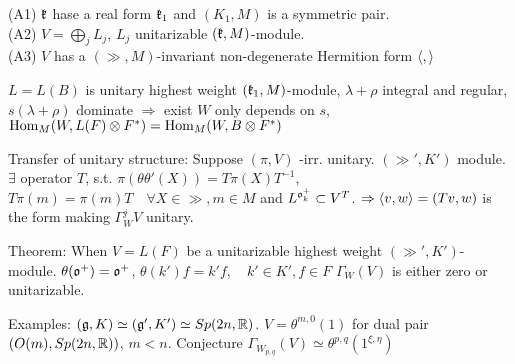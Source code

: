 \documentclass{beamer}
\begin{document}
\begin{frame}[t]
(A1) ${\mathfrak{k}}$ hase a real form ${\mathfrak{k}}_1$ and $(K_1,M)$ is a symmetric pair.\\
(A2) $V = \bigoplus_j L_j$, $L_j$ unitarizable $({\mathfrak{k}},M)$-module.\\
(A3) $V$ has a $(\gg,M)$-invariant non-degenerate Hermition form $\left\langle{},{}\right\rangle$
\end{frame}

\begin{frame}[t]
$L=L(B)$ is unitary highest weight $({\mathfrak{k}}_1,M)$-module, 
$\lambda+\rho$ integral and regular,
$s(\lambda+\rho)$ dominate $\Rightarrow$ exist $W$ only depends on $s$, 
$\mathrm{Hom}_M(W,L(F)\otimes F^*) = \mathrm{Hom}_M(W,B\otimes F^*)$
\end{frame}

\begin{frame}[t]
Transfer of unitary structure: Suppose $(\pi, V)$ -irr. unitary. $(\gg',K')$
module. $\exists$ operator $T$, s.t. 
$\pi(\theta\theta'(X))=T \pi(X)T^{-1}$,
$T\pi(m)=\pi(m)T\quad \forall X\in\gg, m\in M$
and $L^{{\mathfrak{o}}_k^+} \subset V^T$.
$\Rightarrow \left\langle{v},{w}\right\rangle = \left({Tv},{w}\right)$ 
is the form making $\Gamma_W^jV$ unitary.  
\end{frame}

\begin{frame}[t]
Theorem: When $V=L(F)$ be a unitarizable highest weight $(\gg',K')$-module.
$\theta({\mathfrak{o}}^+) = {\mathfrak{o}}^+$, 
$\theta(k')f=k'f, \quad k'\in K', f\in F$
$\Gamma_W(V)$ is either zero or unitarizable.
\end{frame}

\begin{frame}[t]
Examples: $({\mathfrak{g}},K)\simeq({\mathfrak{g}}',K')\simeq Sp(2n,{\mathbb{R}})$.
$V=\theta^{m,0}(1)$ for dual pair $(O(m),Sp(2n,{\mathbb{R}}))$, $m<n$.
Conjecture $\Gamma_{W_{p,q}}(V) \simeq \theta^{p,q}(1^{\xi,\eta})$
\end{frame}
\end{document}

